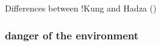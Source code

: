 Differences between !Kung and Hadza (\cite{blurton_jones_differences_1994})
\cite{blurton_jones_foraging_1994}

\cite{bird_children_1995}

\subsubsection{danger of the environment}

\cite{blurton_jones_differences_1994}



